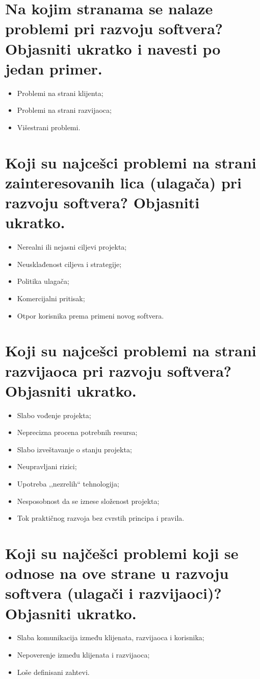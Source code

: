 \documentclass[a4paper]{article}
\begin{document}
\section{Na kojim stranama se nalaze problemi pri razvoju softvera? Objasniti ukratko i navesti 
         po jedan primer.}
    \begin{itemize}
      \item Problemi na strani klijenta;
      \item Problemi na strani razvijaoca;
      \item Višestrani problemi.
    \end{itemize}

\section{Koji su najcešci problemi na strani zainteresovanih lica (ulagača) pri razvoju softvera? 
         Objasniti ukratko.}
    \begin{itemize}
      \item Nerealni ili nejasni ciljevi projekta;
      \item Neusklađenost ciljeva i strategije;
      \item Politika ulagača;
      \item Komercijalni pritisak;
      \item Otpor korisnika prema primeni novog softvera.
    \end{itemize}

\section{Koji su najcešci problemi na strani razvijaoca pri razvoju softvera? Objasniti ukratko.}
    \begin{itemize}
      \item Slabo vođenje projekta;
      \item Neprecizna procena potrebnih resursa;
      \item Slabo izveštavanje o stanju projekta;
      \item Neupravljani rizici;
      \item Upotreba ,,nezrelih`` tehnologija;
      \item Nesposobnost da se iznese složenost projekta;
      \item Tok praktičnog razvoja bez cvrstih principa i pravila.
    \end{itemize}

\section{Koji su najčešci problemi koji se odnose na ove strane u razvoju softvera 
         (ulagači i razvijaoci)? Objasniti ukratko.}
    \begin{itemize}
      \item Slaba komunikacija između klijenata, razvijaoca i korisnika;
      \item Nepoverenje između klijenata i razvijaoca;
      \item Loše definisani zahtevi.
    \end{itemize}
\end{document}
